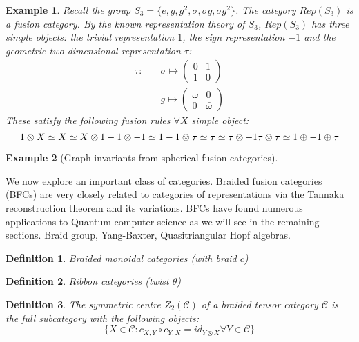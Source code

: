 \documentclass{article}
\newtheorem{definition}{Definition}
\newtheorem{example}{Example}
\begin{document}
\begin{example}
Recall the group $S_3=\{e, g, g^2, \sigma, \sigma g, \sigma g^2 \}$. The category $Rep(S_3)$ is a fusion category. By the known representation theory of $S_3$, $Rep(S_3)$ has three simple objects: the trivial representation $1$, the sign representation $-1$ and the geometric two dimensional representation $\tau$:
\begin{equation*}
\begin{split}
    \tau : \quad & \sigma \mapsto \left( {\begin{array}{cc} 0 & 1 \\ 1 & 0 \end{array}}\right) \\
     & g \mapsto \left( {\begin{array}{cc} \omega & 0 \\ 0 & \bar{\omega} \end{array}}\right)
\end{split}
\end{equation*}
These satisfy the following fusion rules $\forall X$ simple object:
\begin{equation}
        1 \otimes X \simeq X \simeq X \otimes 1\\
        -1 \otimes -1 \simeq 1\\
        -1 \otimes \tau \simeq \tau \simeq \tau \otimes -1\\
        \tau \otimes \tau \simeq 1 \oplus -1 \oplus \tau\\
\end{equation}

\end{example}

\begin{example}[Graph invariants from spherical fusion categories]
\end{example}

We now explore an important class of categories. Braided fusion categories (BFCs) are very closely related to categories of representations via the Tannaka reconstruction theorem and its variations. BFCs have found numerous applications to Quantum computer science as we will see in the remaining sections.
Braid group, Yang-Baxter, Quasitriangular Hopf algebras.
\begin{definition}
Braided monoidal categories (with braid $c$)
\end{definition}
\begin{definition}
Ribbon categories (twist $\theta$)
\end{definition}
\begin{definition}
The symmetric centre $Z_2(\mathcal{C})$ of a braided tensor category $\mathcal{C}$ is the full subcategory with the following objects:
$$ \{ X \in \mathcal{C} : c_{X,Y} \circ c_{Y,X} = id_{Y\otimes X} \forall Y \in \mathcal{C} \} $$
\end{definition}
\end{document}
